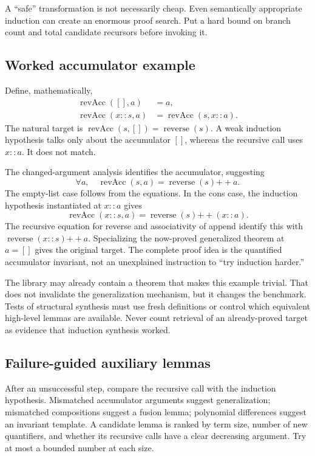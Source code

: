 A ``safe'' transformation is not necessarily cheap. Even semantically
appropriate induction can create an enormous proof search. Put a hard bound
on branch count and total candidate recursors before invoking it.

\subsection{Worked accumulator example}

Define, mathematically,
\begin{align*}
 \operatorname{revAcc}([],a)&=a,\\
 \operatorname{revAcc}(x::s,a)&=\operatorname{revAcc}(s,x::a).
\end{align*}
The natural target is
$\operatorname{revAcc}(s,[])=\operatorname{reverse}(s)$.
A weak induction hypothesis talks only about the accumulator $[]$, whereas the
recursive call uses $x::a$. It does not match.

The changed-argument analysis identifies the accumulator, suggesting
\begin{equation}\label{eq:rev-inv}
 \forall a,\quad \operatorname{revAcc}(s,a)
       =\operatorname{reverse}(s)\mathbin{+\!+}a.
\end{equation}
The empty-list case follows from the equations. In the cons case, the induction
hypothesis instantiated at $x::a$ gives
\[
 \operatorname{revAcc}(x::s,a)
 =\operatorname{reverse}(s)\mathbin{+\!+}(x::a).
\]
The recursive equation for reverse and associativity of append identify this
with $\operatorname{reverse}(x::s)\mathbin{+\!+}a$.
Specializing the now-proved generalized theorem at $a=[]$ gives the original
target. The complete proof idea is the quantified accumulator invariant, not
an unexplained instruction to ``try induction harder.''

The library may already contain a theorem that makes this example trivial.
That does not invalidate the generalization mechanism, but it changes the
benchmark. Tests of structural synthesis must use fresh definitions or control
which equivalent high-level lemmas are available. Never count retrieval of an
already-proved target as evidence that induction synthesis worked.

\subsection{Failure-guided auxiliary lemmas}

After an unsuccessful step, compare the recursive call with the induction
hypothesis. Mismatched accumulator arguments suggest generalization;
mismatched compositions suggest a fusion lemma; polynomial differences suggest
an invariant template. A candidate lemma is ranked by term size, number of new
quantifiers, and whether its recursive calls have a clear decreasing argument.
Try at most a bounded number at each size.

